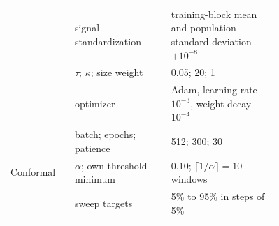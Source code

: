 \documentclass{article}
\begin{document}
\begin{table}[!ht]
\begin{tabular}{@{}l p{0.36\linewidth} p{0.40\linewidth}@{}}
          & signal standardization & training-block mean and population standard deviation $+10^{-8}$ \\
          & $\tau$; $\kappa$; size weight & 0.05; 20; 1 \\
          & optimizer & Adam, learning rate $10^{-3}$, weight decay $10^{-4}$ \\
          & batch; epochs; patience & 512; 300; 30 \\
    Conformal & $\alpha$; own-threshold minimum & 0.10; $\lceil1/\alpha\rceil=10$ windows \\
              & sweep targets & 5\% to 95\% in steps of 5\% \\
    \bottomrule
  \end{tabular}
\end{table}
\end{document}
